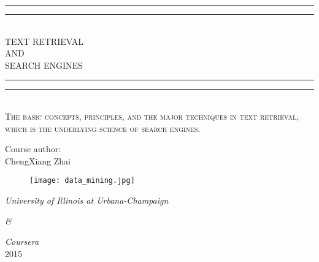 \begin{titlepage}

\centering %
\vspace*{\baselineskip} %

\rule{\textwidth}{1.6pt}\vspace*{-\baselineskip}\vspace*{2pt} %
\rule{\textwidth}{0.4pt}\\[\baselineskip] %

{\LARGE TEXT RETRIEVAL \\ AND \\[0.3\baselineskip] SEARCH ENGINES}\\[0.2\baselineskip] %

\rule{\textwidth}{0.4pt}\vspace*{-\baselineskip}\vspace{3.2pt} %
\rule{\textwidth}{1.6pt}\\[\baselineskip] %

\scshape %
The basic concepts, principles, and the major techniques in text retrieval,\\ 
which is the underlying science of search engines. \\[\baselineskip] %

\vspace*{2\baselineskip} %

Course author:\\[\baselineskip]
{\Large ChengXiang Zhai}\\[\baselineskip]

\begin{figure}[H]
    \centering
    \texttt{[image: data\_mining.jpg]}
\end{figure}

\vfill

{\large \itshape University of Illinois at Urbana-Champaign\par}
{\large \itshape \&\par}
{\large \itshape Coursera}\\[\baselineskip]
{\Large 2015}

\end{titlepage}

\thispagestyle{empty}
\tableofcontents
\newpage